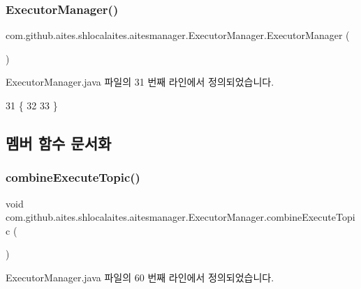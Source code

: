 \subsubsection{\texorpdfstring{Executor\+Manager()}{ExecutorManager()}\hspace{0.1cm}{\footnotesize\ttfamily [2/2]}}
{\footnotesize\ttfamily com.\+github.\+aites.\+shlocalaites.\+aitesmanager.\+Executor\+Manager.\+Executor\+Manager (\begin{DoxyParamCaption}{ }\end{DoxyParamCaption})}



Executor\+Manager.\+java 파일의 31 번째 라인에서 정의되었습니다.


\begin{DoxyCode}
31                             \{
32         
33     \}
\end{DoxyCode}


\subsection{멤버 함수 문서화}
\mbox{\label{classcom_1_1github_1_1aites_1_1shlocalaites_1_1aitesmanager_1_1_executor_manager_a46bc682fc2a203c32d531db12d664860}} 
\subsubsection{\texorpdfstring{combine\+Execute\+Topic()}{combineExecuteTopic()}}
{\footnotesize\ttfamily void com.\+github.\+aites.\+shlocalaites.\+aitesmanager.\+Executor\+Manager.\+combine\+Execute\+Topic (\begin{DoxyParamCaption}{ }\end{DoxyParamCaption})\hspace{0.3cm}{\ttfamily [private]}}



Executor\+Manager.\+java 파일의 60 번째 라인에서 정의되었습니다.


